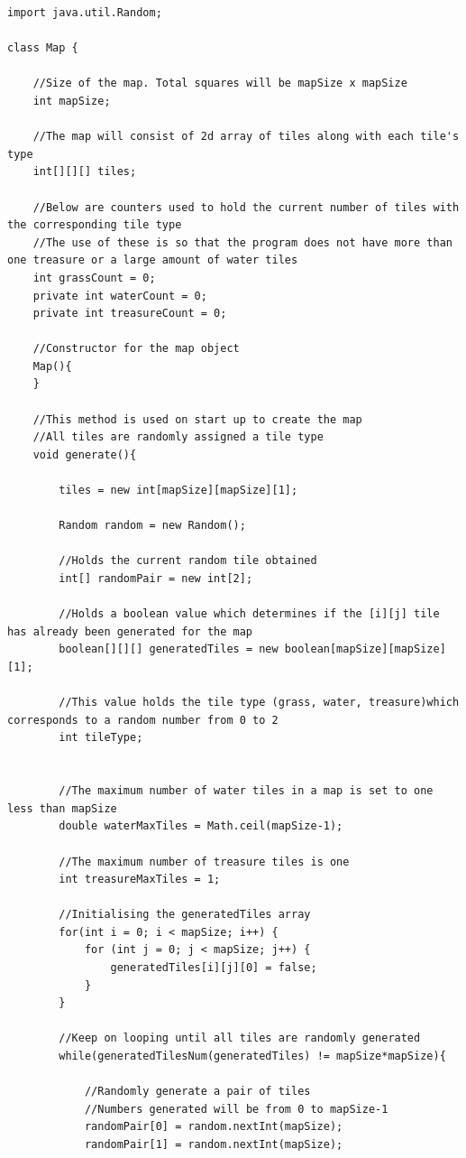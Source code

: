 \documentclass[a4paper,12pt]{extarticle}
\begin{document}
\begin{lstlisting}[caption=The initial code of the Map class]
import java.util.Random;

class Map {

    //Size of the map. Total squares will be mapSize x mapSize
    int mapSize;

    //The map will consist of 2d array of tiles along with each tile's type
    int[][][] tiles;

    //Below are counters used to hold the current number of tiles with the corresponding tile type
    //The use of these is so that the program does not have more than one treasure or a large amount of water tiles
    int grassCount = 0;
    private int waterCount = 0;
    private int treasureCount = 0;

    //Constructor for the map object
    Map(){
    }

    //This method is used on start up to create the map
    //All tiles are randomly assigned a tile type
    void generate(){

        tiles = new int[mapSize][mapSize][1];

        Random random = new Random();

        //Holds the current random tile obtained
        int[] randomPair = new int[2];

        //Holds a boolean value which determines if the [i][j] tile has already been generated for the map
        boolean[][][] generatedTiles = new boolean[mapSize][mapSize][1];

        //This value holds the tile type (grass, water, treasure)which corresponds to a random number from 0 to 2
        int tileType;


        //The maximum number of water tiles in a map is set to one less than mapSize
        double waterMaxTiles = Math.ceil(mapSize-1);

        //The maximum number of treasure tiles is one
        int treasureMaxTiles = 1;

        //Initialising the generatedTiles array
        for(int i = 0; i < mapSize; i++) {
            for (int j = 0; j < mapSize; j++) {
                generatedTiles[i][j][0] = false;
            }
        }

        //Keep on looping until all tiles are randomly generated
        while(generatedTilesNum(generatedTiles) != mapSize*mapSize){

            //Randomly generate a pair of tiles
            //Numbers generated will be from 0 to mapSize-1
            randomPair[0] = random.nextInt(mapSize);
            randomPair[1] = random.nextInt(mapSize);


\end{lstlisting}
\end{document}
